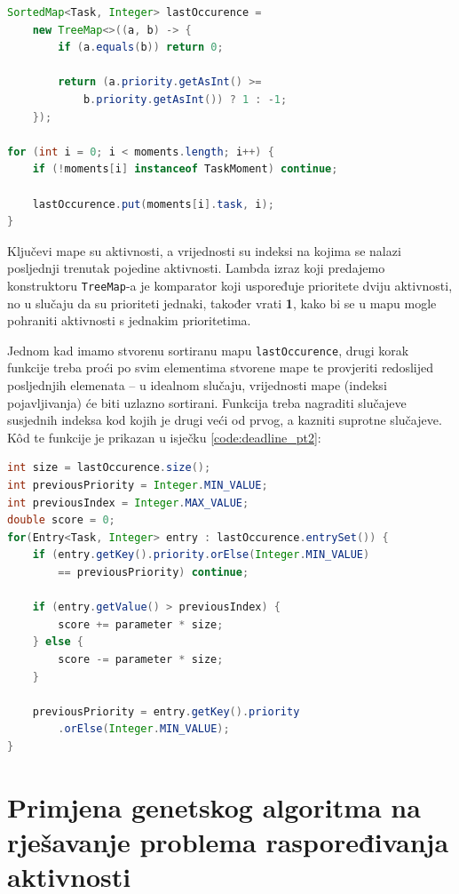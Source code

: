\documentclass[times, utf8, zavrsni]{fer}
\begin{document}
\begin{lstlisting}[language=java, caption=Određivanje posljednjeg trenutka aktivnosti, label={code:deadline_occurence}, mathescape]
SortedMap<Task, Integer> lastOccurence =
    new TreeMap<>((a, b) -> {
        if (a.equals(b)) return 0;
        
        return (a.priority.getAsInt() >=
            b.priority.getAsInt()) ? 1 : -1;
    });

for (int i = 0; i < moments.length; i++) {
    if (!moments[i] instanceof TaskMoment) continue;
    
    lastOccurence.put(moments[i].task, i);
}
\end{lstlisting}
Ključevi mape su aktivnosti, a vrijednosti su indeksi na kojima se nalazi posljednji trenutak pojedine aktivnosti. Lambda izraz koji predajemo konstruktoru \texttt{TreeMap}-a je komparator koji uspoređuje prioritete dviju aktivnosti, no u slučaju da su prioriteti jednaki, također vrati \textbf{1}, kako bi se u mapu mogle pohraniti aktivnosti s jednakim prioritetima.

Jednom kad imamo stvorenu sortiranu mapu \texttt{lastOccurence}, drugi korak funkcije treba proći po svim elementima stvorene mape te provjeriti redoslijed posljednjih elemenata -- u idealnom slučaju, vrijednosti mape (indeksi pojavljivanja) će biti uzlazno sortirani. Funkcija treba nagraditi slučajeve susjednih indeksa kod kojih je drugi veći od prvog, a kazniti suprotne slučajeve. K\^{o}d te funkcije je prikazan u isječku \ref{code:deadline_pt2}:

\begin{lstlisting}[language=java, caption=Provjera redoslijeda aktivnosti, label={code:deadline_pt2}, mathescape]
int size = lastOccurence.size();
int previousPriority = Integer.MIN_VALUE;
int previousIndex = Integer.MAX_VALUE;
double score = 0;
for(Entry<Task, Integer> entry : lastOccurence.entrySet()) {
    if (entry.getKey().priority.orElse(Integer.MIN_VALUE)
        == previousPriority) continue;
        
    if (entry.getValue() > previousIndex) {
        score += parameter * size;
    } else {
        score -= parameter * size;
    }
    
    previousPriority = entry.getKey().priority
        .orElse(Integer.MIN_VALUE);
}
\end{lstlisting}

\chapter{Primjena genetskog algoritma na rješavanje problema raspoređivanja aktivnosti}\label{primjena genetskog algoritma}
\end{document}
